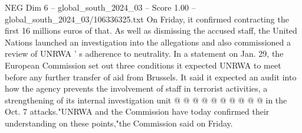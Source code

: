 \begin{textsample}{NEG Dim 6 – global\_south\_2024\_03 – Score 1.00 – global\_south\_2024\_03/106336325.txt}
On Friday, it confirmed contracting the first 16 millions euros of that.
As well as dismissing the accused staff, the United Nations launched an investigation into the allegations and also commissioned a review of UNRWA ' s adherence to neutrality.
In a statement on Jan. 29, the European Commission set out three conditions it expected UNRWA to meet before any further transfer of aid from Brussels.
It said it expected an audit into how the agency prevents the involvement of staff in terrorist activities, a strengthening of its internal investigation unit @ @ @ @ @ @ @ @ @ @ in the Oct. 7 attacks."UNRWA and the Commission have today confirmed their understanding on these points,"the Commission said on Friday.

\end{textsample}
